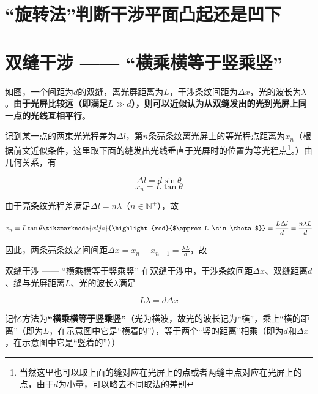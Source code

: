 \section{“旋转法”判断干涉平面凸起还是凹下}

\section{双缝干涉 —— “横乘横等于竖乘竖”}



如图，一个间距为$d$的双缝，离光屏距离为$L$，干涉条纹间距为$\Delta x$，光的波长为$\lambda$。\textbf{由于光屏比较远（即满足$L \gg d$），则可以近似认为从双缝发出的光到光屏上同一点的光线互相平行}。

记到某一点的两束光光程差为$\Delta l$，第$n$条亮条纹离光屏上的等光程点距离为$x_n$（根据前文近似条件，这里取下面的缝发出光线垂直于光屏时的位置为等光程点\footnote{当然这里也可以取上面的缝对应在光屏上的点或者两缝中点对应在光屏上的点，由于$d$为小量，可以略去不同取法的差别}。）由几何关系，有

$$ \Delta l = d \sin \theta $$
$$ x_n = L \tan \theta $$

由于亮条纹光程差满足$\Delta l = n \lambda$（$n \in \mathbb{N^{+}}$），故

\begin{subequations}
\begin{align*}
x_n = L \tan \theta \tikzmarknode{xljs}{\highlight{red}{$\approx L \sin \theta$}} = \frac{L \Delta l}{d} = \frac{n \lambda L}{d}
\end{align*}
\end{subequations}


\vspace{2\baselineskip}
因此，两条亮条纹之间间距$\Delta x = x_n - x_{n-1} = \frac{\lambda L}{d}$，故

\begin{theo}{双缝干涉 —— “横乘横等于竖乘竖”}{}
在双缝干涉中，干涉条纹间距$\Delta x$、双缝距离$d$、缝与光屏距离$L$、光的波长$\lambda$满足

$$L \lambda = d \Delta x$$

记忆方法为\textbf{“横乘横等于竖乘竖”}（光为横波，故光的波长记为“横”，乘上“横的距离”（即为$L$，在示意图中它是“横着的”），等于两个“竖的距离”相乘（即为$d$和$\Delta x$，在示意图中它是“竖着的”））
\end{theo}


